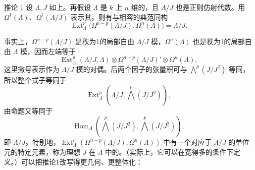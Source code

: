 \begin{statement}{推论 1}
设 $\Lambda,J$ 如上。再假设 $\Lambda$ 是 $k$ 上 $n$ 维的，且 $\Lambda/J$ 也是正则仿射代数。用 $\Omega^1(\Lambda)$、$\Omega^1(\Lambda/J)$ 表示其。则有与相容的典范同构
\begin{equation}
\operatorname{Ext}_{\Lambda}^{p}
\bigl(\Omega^{n-p}(\Lambda/J),\Omega^n(\Lambda)\bigr)=\Lambda/J.
\tag{3.5}
\end{equation}
\end{statement}
事实上，$\Omega^{n-p}(\Lambda/J)$ 是秩为1的局部自由 $\Lambda/J$ 模，$\Omega^n(\Lambda)$ 也是秩为1的局部自由 $\Lambda$ 模，因而左端等于
\[
\operatorname{Ext}_{\Lambda}^{p}(\Lambda/J,\Lambda)
\otimes\Omega^{n-p}(\Lambda/J)'\otimes\Omega^n(\Lambda),
\]
这里撇号表示作为 $\Lambda/J$ 模的对偶。后两个因子的张量积可与 $\bigwedge^p(J/J^2)$ 等同，所以整个式子等同于
\[
\operatorname{Ext}_{\Lambda}^{p}
\left(\Lambda/J,\bigwedge^p(J/J^2)\right),
\]
由命题又等同于
\[
\operatorname{Hom}_{\Lambda}
\left(\bigwedge^p(J/J^2),\bigwedge^p(J/J^2)\right),
\]
即 $\Lambda/J$。特别地，$\operatorname{Ext}_{\Lambda}^{p}(\Omega^{n-p}(\Lambda/J),\Omega^n(\Lambda))$ 中有一个对应于 $\Lambda/J$ 的单位元的特定元素，称为理想 $J$ 在 $\Lambda$ 中的。（实际上，它可以在宽得多的条件下定义。）可以把推论1改写得更几何、更整体化：

